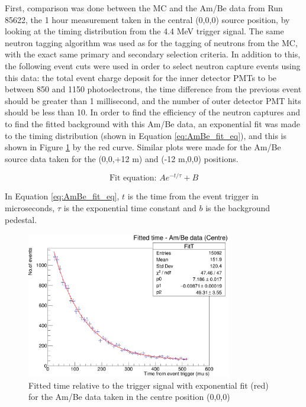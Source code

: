 First, comparison was done between the MC and the Am/Be data from Run 85622, the 1 hour measurement taken in the central (0,0,0) source position, by looking at the timing distribution from the 4.4 MeV trigger signal. The same neutron tagging algorithm was used as for the tagging of neutrons from the MC, with the exact same primary and secondary selection criteria. In addition to this, the following event cuts were used in order to select neutron capture events using this data: the total event charge deposit for the inner detector PMTs to be between 850 and 1150 photoelectrons, the time difference from the previous event should be greater than 1 millisecond, and the number of outer detector PMT hits should be less than 10. In order to find the efficiency of the neutron captures and to find the fitted background with this Am/Be data, an exponential fit was made to the timing distribution (shown in Equation \ref{eq:AmBe_fit_eq}), and this is shown in Figure \ref{fig:ambe_centre} by the red curve. Similar plots were made for the Am/Be source data taken for the (0,0,+12 m) and (-12 m,0,0) positions. 


\begin{equation}
\text{Fit equation: } A e^{-t / \tau}+B
\label{eq:AmBe_fit_eq}
\end{equation}

In Equation \ref{eq:AmBe_fit_eq}, $t$ is the time from the event trigger in microseconds, $\tau$ is the exponential time constant and $b$ is the background pedestal. 

\begin{figure}
    \centering
    \includegraphics[width=0.8\textwidth]{Figures/ambe_centre.png}
    \caption{Fitted time relative to the trigger signal with exponential fit (red) for the Am/Be data taken in the centre position (0,0,0)}
    \label{fig:ambe_centre}
\end{figure}

